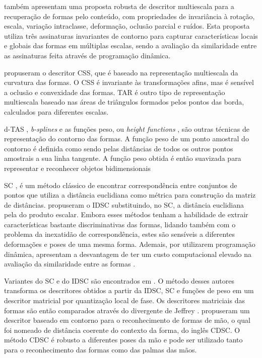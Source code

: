  também apresentam uma proposta robusta de descritor multiescala para a recuperação de formas pelo conteúdo, com propriedades de invariância à rotação, escala, variação intraclasse, deformação,  oclusão parcial e ruídos. Esta proposta utiliza três assinaturas invariantes de contorno para capturar características locais e globais das formas em múltiplas escalas, sendo a avaliação da similaridade entre as assinaturas feita através de programação dinâmica.


 propuseram o descritor \ac{CSS}, que é baseado na representação multiescala da curvatura das formas. O \ac{CSS} é invariante às transformações afins, mas é sensível a oclusão e convexidade das formas. \ac{TAR} \cite{Alajlan20117} é outro tipo de representação multiescala baseado nas áreas de triângulos formados pelos pontos das borda, calculados para diferentes escalas. 

\ac{d-TAS} \cite{4202050}, \textit{b-splines} \cite{1168520} e as funções peso, ou \textit{height functions} \cite{Wang2012134}, são outras técnicas de representação do contorno das formas. A função peso de um ponto amostral do contorno é definida como sendo pelas distâncias de todos os outros pontos amostrais a sua linha tangente. A função peso obtida é então suavizada para representar e reconhecer objetos bidimensionais

\ac{SC} \cite{Belongie:2002}, é um método clássico de encontrar correspondência entre conjuntos de pontos que utiliza a distância euclidiana como métrica para construção da matriz de distâncias.  propuseram o \ac{IDSC} substituindo, no \ac{SC}, a distância euclidiana pela do produto escalar. Embora esses métodos tenham a habilidade de extrair características bastante discriminativas das formas, lidando também com o problema da inexatidão de correspondência, estes são sensíveis a diferentes deformações e poses de uma mesma forma. Ademais, por utilizarem programação dinâmica, apresentam a desvantagem de ter um custo computacional elevado na avaliação da similaridade entre as formas \cite{FreitasS.TorresMiranda2016}.

Variantes do \ac{SC} e do \ac{IDSC} são encontrados em . O método desses autores transforma os descritores obtidos a partir da \ac{IDSC}, \ac{SC} e funções de peso em um descritor matricial por quantização local de fase. Os descritores matriciais das formas são então comparados através do divergente de Jeffrey \cite{Ullah1996}.  propuseram um descritor baseado em contorno para o reconhecimento de formas de mão, o qual foi nomeado de distância coerente do contexto da forma, do inglês \ac{CDSC}. O método \ac{CDSC} é robusto a diferentes poses da mão e pode ser utilizado tanto para o reconhecimento das formas como das palmas das mãos.  

